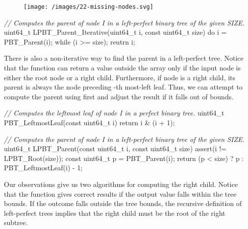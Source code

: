 \documentclass{article}
\begin{document}
\begin{figure}[grayscale-diagram]
  \texttt{[image: /images/22-missing-nodes.svg]}
\end{figure}

\begin{code}[c]
\emph{// Computes the parent of node I in a left-perfect binary tree of the given SIZE.}
uint64_t LPBT_Parent_Iterative(uint64_t i, const uint64_t size) {
    do { i = PBT_Parent(i); } while (i >= size);
    reutrn i;
}
\end{code}

There is also a non-iterative way to find the parent in a left-perfect tree.
Notice that the  function can return a value outside the array only if the input node is either the root node or a right child.
Furthermore, if node  is a right child, its parent is always the node preceding -th most-left leaf. 
Thus, we can attempt to compute the parent using  first and adjust the result if it falls out of bounds.

\begin{code}[c]
\emph{// Computes the leftmost leaf of node I in a perfect binary tree.}
uint64_t PBT_LeftmostLeaf(const uint64_t i) {
    return i & (i + 1);
}

\emph{// Computes the parent of node I in a left-perfect binary tree of the given SIZE.}
uint64_t LPBT_Parent(const uint64_t i, const uint64_t size) {
    assert(i != LPBT_Root(size));
    const uint64_t p = PBT_Parent(i);
    return (p < size) ? p : PBT_LeftmostLeaf(i) - 1;
}
\end{code}

Our observations give us two algorithms for computing the right child.
Notice that the  function gives correct results if the output value falls within the tree bounds.
If the outcome falls outside the tree bounds, the recursive definition of left-perfect trees implies that the right child must be the root of the right subtree.
\end{document}
